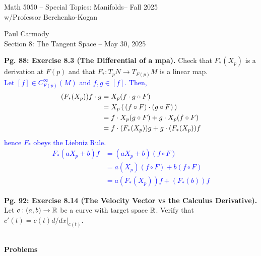 \documentclass[12pt,a4paper]{report}
\newcommand{\CLASSNAME}{Math 5050 -- Special Topics: Manifolds}
\newcommand{\STUDENTNAME}{Paul Carmody}
\newcommand{\ASSIGNMENT}{Section 8: The Tangent Space }
\newcommand{\DUEDATE}{May 30, 2025}
\newcommand{\PROFESSOR}{Professor Berchenko-Kogan}
\newcommand{\SEMESTER}{Fall 2025}
\newcommand{\BLUE}[1]{\textcolor{blue}{#1}}
\begin{document}
\begin{center}
	\Large{\CLASSNAME -- \SEMESTER} \\
	\large{ w/\PROFESSOR}
\end{center}
\begin{center}
	\STUDENTNAME \\
	\ASSIGNMENT -- \DUEDATE\\
\end{center} 

\noindent\textbf{Pg. 88: Exercise 8.3 (The Differential of a mpa).}  Check that $F_*(X_p)$ is a derivation at $F(p)$ and that $F_*: T_p N\to T_{F(p)} M$ is a linear map.\\

\BLUE{Let $[f] \in C^\infty_{F(p)}(M)$  and  $f, g \in [f]$. Then,
\begin{align*}
	(F_*(X_p))f\cdot g &=  X_p(f\cdot g \circ F)\\
	&=  X_p\left (\, (f\circ F)\cdot(g \circ F)  \,\right )\\
	&= f\cdot X_p(g \circ F) + g\cdot X_p(f\circ F)\\
	&= f\cdot (F_*(X_p))g+g\cdot(F_*(X_p))f
\end{align*}hence $F_*$ obeys the Liebniz Rule.
\begin{align*}
	F_*(aX_p +b)f &= (aX_p+b)(f \circ F)\\
	&= a(X_p)(f\circ F)+b(f \circ F)\\
	&= a(F_*(X_p))f+(F_*(b))f
\end{align*}
}

\HLINE
\noindent\textbf{Pg. 92: Exercise 8.14 (The Velocity Vector vs the Calculus Derivative).}  Let $c:(a,b) \to \mathbb{R}$ be a curve with target space $\mathbb{R}$.  Verify that $c'(t) = \dot{c}(t)d/dx|_{c(t)}$.

\HLINE
\noindent \textbf{\\\large{Problems}}
\end{document}
